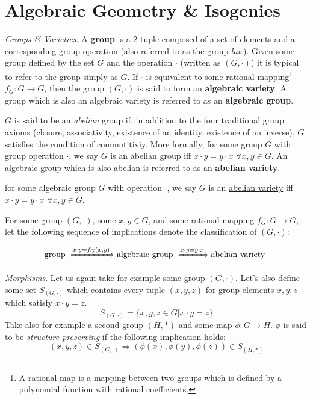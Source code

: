 \section{Algebraic Geometry \& Isogenies}
\emph{Groups \& Varieties}. A \textbf{group} is a 2-tuple composed of a set of elements and a corresponding group operation (also referred to as the group \emph{law}). Given some group defined by the set $G$ and the operation $\cdot$ (written as $(G,\cdot)$) it is typical to refer to the group simply as $G$. If $\cdot$ is equivalent to some rational mapping\footnote{A rational map is a mapping between two groups which is defined by a polynomial function with rational coefficients.} $f_G: G \rightarrow G$, then the group $(G,\cdot)$ is said to form an \textbf{algebraic variety}. A group which is also an algebraic variety is referred to as an \textbf{algebraic group}.

$G$ is said to be an \emph{abelian} group if, in addition to the four traditional group axioms (closure, associativity, existence of an identity, existence of an inverse), $G$ satisfies the condition of commutitiviy. More formally, for some group $G$ with group operation $\cdot$, we say $G$ is an abelian group iff $x \cdot y = y \cdot x$ $\forall x, y \in G$. An algebraic group which is also abelian is referred to as an \textbf{abelian variety}.

\begin{tcolorbox}
\begin{definition}
\label{defn:abelianvariety}
for some algebraic group $G$ with operation $\cdot$, we say $G$ is an \underline{abelian variety} iff $x \cdot y = y \cdot x$ $\forall x, y \in G$. 
\end{definition}
\end{tcolorbox}

For some group $(G,\cdot)$, some $x,y \in G$, and some rational mapping $f_G: G \rightarrow G$, let the following sequence of implications denote the classification of $(G,\cdot)$:

$$
\text{group } \xRightarrow[]{x\cdot y = f_G(x,y)} \text{algebraic group } \xRightarrow[]{x\cdot y = y\cdot x} \text{abelian variety }
$$

\noindent
\emph{Morphisms}. Let us again take for example some group $(G,\cdot)$. Let's also define some set $S_{(G,\cdot)}$ which contains every tuple $(x,y,z)$ for group elements $x,y,z$ which satisfy $x\cdot y = z$.
$$
S_{(G,\cdot)} = \{x,y,z \in G | x\cdot y = z\}
$$
Take also for example a second group $(H,*)$ and some map $\phi: G \rightarrow H$. $\phi$ is said to be \emph{structure preserving} if the following implication holds:
$$
(x,y,z) \in S_{(G,\cdot)} \Rightarrow (\phi(x),\phi(y),\phi(z)) \in S_{(H,*)}
$$

